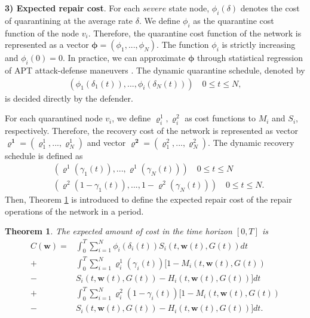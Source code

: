 \documentclass[lettersize,journal]{IEEEtran}
\newtheorem{theorem}{ \textbf{Theorem}}
\begin{document}
\par
\textbf{3) Expected repair cost}. For each $severe$ state node, $\phi_i(\delta)$ denotes the cost of quarantining at the average rate $\delta$. We define $\phi_i$ as the quarantine cost function of the node $v_i$. Therefore, the quarantine cost function of the network is represented as a vector $\bm{\phi}=(\phi_1,...,\phi_N)$. The function $\phi_i$ is strictly increasing and $\phi_i(0) = 0$. In practice, we can approximate $\bm{\phi}$ through statistical regression of APT attack-defense maneuvers \cite{diogenes2018cybersecurity}. The dynamic quarantine schedule, denoted by
\begin{equation}\label{eq_quarantine scheme}
\begin{aligned}
   (\phi_1(\delta_1(t)),...,\phi_i(\delta_N(t))) \quad 0\leq t \leq N,
\end{aligned}
\end{equation}
is decided directly by the defender. \par
For each quarantined node $v_i$, we define $\varrho^1_i,\varrho^2_i$ as cost functions to $M_i$ and $S_i$, respectively. Therefore, the recovery cost of the network is represented as vector $\bm{\varrho^1}=(\varrho^1_1,...,\varrho^1_N)$ and vector $\bm{\varrho^2}=(\varrho^2_1,...,\varrho^2_N)$. The dynamic recovery schedule is defined as
\begin{equation}\label{eq_recovery scheme}
\begin{aligned}
   &(\varrho^1(\gamma_1(t)),...,\varrho^1(\gamma_N(t))) \quad 0\leq t \leq N \\
   &(\varrho^2(1-\gamma_1(t)),...,1-\varrho^2(\gamma_N(t))) \quad 0\leq t \leq N.
\end{aligned}
\end{equation}
Then, Theorem \ref{theo4} is introduced to define the expected repair cost of the repair operations of the network in a period. 
\begin{theorem}\label{theo4}
 The expected amount of cost in the time horizon $[0, T]$ is
\begin{equation}\label{eq_cost}
\begin{aligned}
   C(\bm{w}) =&\int_0^T\sum_{i=1}^N\phi_i(\delta_i(t))S_i(t,\bm{w}(t),G(t))dt \\
   + &\int_0^T\sum_{i=1}^N\varrho^1_i(\gamma_i(t))[1-M_i(t,\bm{w}(t),G(t))\\-&S_i(t,\bm{w}(t),G(t))-H_i(t,\bm{w}(t),G(t))]dt \\
   + &\int_0^T\sum_{i=1}^N\varrho^2_i(1-\gamma_i(t))[1-M_i(t,\bm{w}(t),G(t))\\-&S_i(t,\bm{w}(t),G(t))-H_i(t,\bm{w}(t),G(t))]dt.
   \end{aligned}
\end{equation}
\end{theorem}
\end{document}

